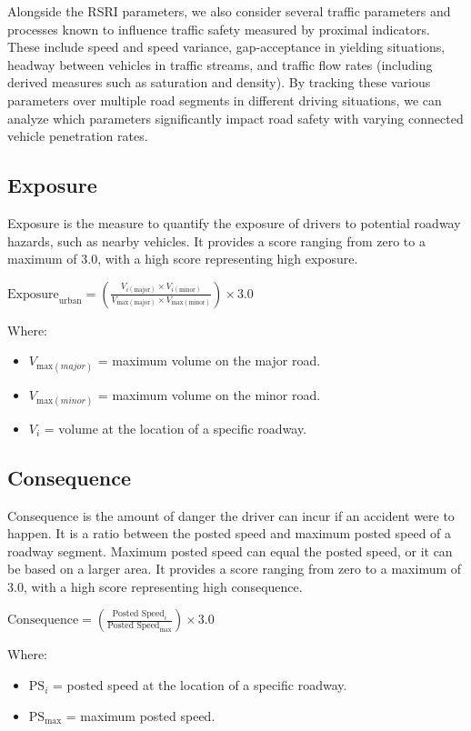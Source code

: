 	Alongside the RSRI parameters, we also consider several traffic parameters and processes known to influence traffic safety measured by proximal indicators. These include speed and speed variance, gap-acceptance in yielding situations, headway between vehicles in traffic streams, and traffic flow rates (including derived measures such as saturation and density). By tracking these various parameters over multiple road segments in different driving situations, we can analyze which parameters significantly impact road safety with varying connected vehicle penetration rates.
	
	\subsection{Exposure}
		Exposure is the measure to quantify the exposure of drivers to potential roadway hazards, such as nearby vehicles. It provides a score ranging from zero to a maximum of 3.0, with a high score representing high exposure.
			
			\( \text{Exposure}_\text{urban}=(\frac{V_{i(\text{major})} \times V_{i(\text{minor})}}{V_{\text{max}(\text{major})} \times V_{\text{max}(\text{minor})}})\times3.0 \)

		Where:
			\begin{itemize}
				\item \( V_{\text{max}(major)} \) = maximum volume on the major road.
				\item \( V_{\text{max}(minor)} \) = maximum volume on the minor road.
				\item \( V_{i} \) = volume at the location of a specific roadway.
			\end{itemize}

	\subsection{Consequence}
		Consequence is the amount of danger the driver can incur if an accident were to happen. It is a ratio between the posted speed and maximum posted speed of a roadway segment. Maximum posted speed can equal the posted speed, or it can be based on a larger area. It provides a score ranging from zero to a maximum of 3.0, with a high score representing high consequence.
		
		\( \text{Consequence}=(\frac{\text{Posted Speed}_i}{\text{Posted Speed}_\text{max}})\times3.0 \)
			
		Where:
			\begin{itemize}
				\item \( \text{PS}_i \) = posted speed at the location of a specific roadway.
				\item \( \text{PS}_\text{max} \) = maximum posted speed.
			\end{itemize}

